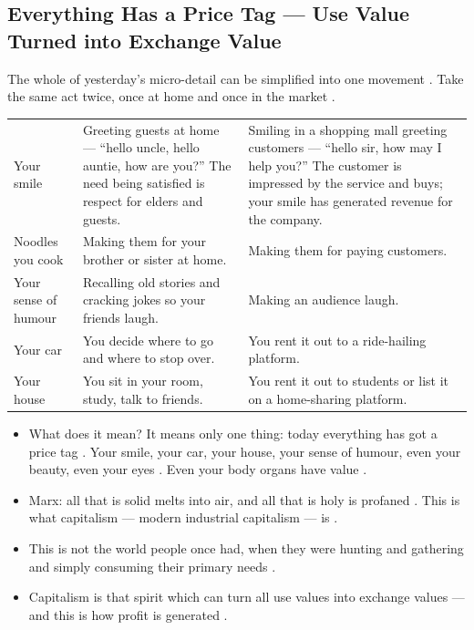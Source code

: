 \subsection{Everything Has a Price Tag --- Use Value Turned into Exchange Value}
The whole of yesterday's micro-detail can be simplified into one movement . Take the same act twice, once at home and once in the market .

\begin{table}[h!]
\centering
\begin{tabularx}{\textwidth}{lYY}
\toprule
{}
 &  &  \\
\midrule
Your smile & Greeting guests at home --- ``hello uncle, hello auntie, how are you?'' The need being satisfied is respect for elders and guests. & Smiling in a shopping mall greeting customers --- ``hello sir, how may I help you?'' The customer is impressed by the service and buys; your smile has generated revenue for the company. \\
Noodles you cook & Making them for your brother or sister at home. & Making them for paying customers. \\
Your sense of humour & Recalling old stories and cracking jokes so your friends laugh. & Making an audience laugh. \\
Your car & You decide where to go and where to stop over. & You rent it out to a ride-hailing platform. \\
Your house & You sit in your room, study, talk to friends. & You rent it out to students or list it on a home-sharing platform. \\
\bottomrule
\end{tabularx}
\end{table}

\begin{itemize}
    \item What does it mean? It means only one thing: today everything has got a price tag . Your smile, your car, your house, your sense of humour, even your beauty, even your eyes . Even your body organs have value .
\end{itemize}

\begin{KeyConcept}
\begin{itemize}
    \item Marx: all that is solid melts into air, and all that is holy is profaned . This is what capitalism --- modern industrial capitalism --- is .
    \item This is not the world people once had, when they were hunting and gathering and simply consuming their primary needs .
    \item Capitalism is that spirit which can turn all use values into exchange values --- and this is how profit is generated .
\end{itemize}
\end{KeyConcept}

